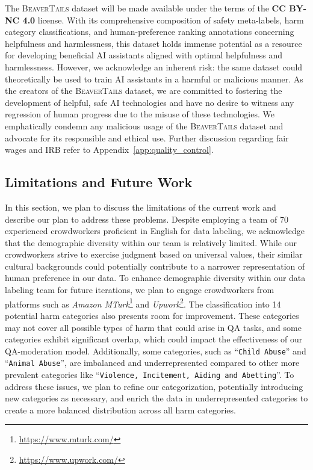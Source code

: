 \documentclass{article}
\begin{document}
The \textsc{BeaverTails} dataset will be made available under the terms of the \textbf{CC BY-NC 4.0} license. With its comprehensive composition of safety meta-labels, harm category classifications, and human-preference ranking annotations concerning helpfulness and harmlessness, this dataset holds immense potential as a resource for developing beneficial AI assistants aligned with optimal helpfulness and harmlessness. However, we acknowledge an inherent risk: the same dataset could theoretically be used to train AI assistants in a harmful or malicious manner. As the creators of the \textsc{BeaverTails} dataset, we are committed to fostering the development of helpful, safe AI technologies and have no desire to witness any regression of human progress due to the misuse of these technologies. We emphatically condemn any malicious usage of the \textsc{BeaverTails} dataset and advocate for its responsible and ethical use. Further discussion regarding fair wages and IRB refer to Appendix~\ref{app:quality_control}.

\vspace{-0.5em}
\subsection{Limitations and Future Work}
\vspace{-0.5em}

In this section, we plan to discuss the limitations of the current work and describe our plan to address these problems.
Despite employing a team of 70 experienced crowdworkers proficient in English for data labeling, we acknowledge that the demographic diversity within our team is relatively limited. While our crowdworkers strive to exercise judgment based on universal values, their similar cultural backgrounds could potentially contribute to a narrower representation of human preference in our data. To enhance demographic diversity within our data labeling team for future iterations, we plan to engage crowdworkers from platforms such as \textit{Amazon MTurk}\footnote{\url{https://www.mturk.com/}} and \textit{Upwork}\footnote{\url{https://www.upwork.com/}}.
The classification into 14 potential harm categories also presents room for improvement. These categories may not cover all possible types of harm that could arise in QA tasks, and some categories exhibit significant overlap, which could impact the effectiveness of our QA-moderation model. Additionally, some categories, such as ``\texttt{Child Abuse}'' and ``\texttt{Animal Abuse}'', are imbalanced and underrepresented compared to other more prevalent categories like ``\texttt{Violence, Incitement, Aiding and Abetting}''. To address these issues, we plan to refine our categorization, potentially introducing new categories as necessary, and enrich the data in underrepresented categories to create a more balanced distribution across all harm categories.
\end{document}
